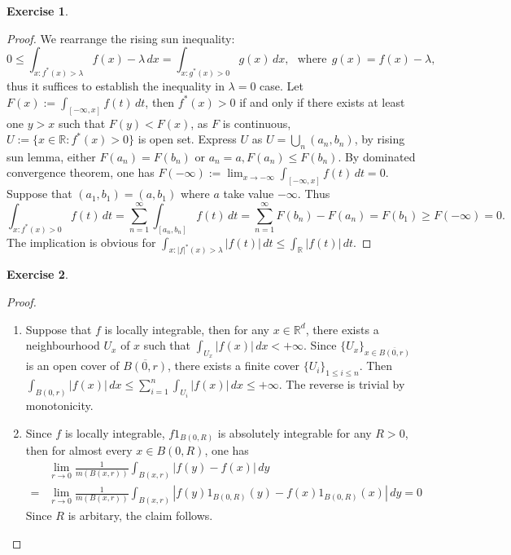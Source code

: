 \documentclass[a4paper]{article}
\newtheorem{ex}{Exercise}[subsection]
\begin{document}
\begin{ex}\end{ex}\begin{proof}
We rearrange the rising sun inequality:$$
0 \leq \int_{x: f^*(x) > \lambda} f(x) - \lambda\,dx = \int_{x: g^*(x) > 0} g(x)\,dx,\ \ \ \text{where}\ \ g(x) = f(x) - \lambda,
$$thus it suffices to establish the inequality in $\lambda = 0$ case. Let $F(x) := \int_{[-\infty, x]}f(t)\,dt$, then 
$f^*(x) > 0$ if and only if there exists at least one $y > x$ such that $F(y) < F(x)$, as $F$ is continuous, 
$U := \{x \in \mathbb{R} : f^*(x) > 0\}$ is open set. Express $U$ as $U = \bigcup_{n} (a_n, b_n)$, by rising sun lemma,
either $F(a_n) = F(b_n)$ or $a_n = a, F(a_n) \leq F(b_n)$. By dominated convergence theorem, one has 
$F(-\infty) := \lim_{x \to -\infty} \int_{[-\infty, x]} f(t)\,dt = 0$. Suppose that $(a_1, b_1) = (a, b_1)$ where
$a$ take value $-\infty$. Thus \[
\int_{x: f^*(x) > 0} f(t)\,dt = \sum_{n = 1}^\infty \int_{[a_n, b_n]}f(t)\,dt = \sum_{n = 1}^\infty F(b_n) - F(a_n)
= F(b_1) \geq F(-\infty) = 0. 
\]The implication is obvious for $\int_{x: |f|^*(x) > \lambda} |f(t)|\,dt \leq \int_\mathbb{R} |f(t)|\,dt$.
\end{proof}

\begin{ex}\end{ex}\begin{proof}\ 
\begin{enumerate}[label = (\roman*)]
    \item Suppose that $f$ is locally integrable, then for any $x \in \mathbb{R}^d$, there exists a neighbourhood $U_x$ of 
    $x$ such that $\int_{U_x} |f(x)|\,dx < +\infty$. Since $\{U_x\}_{x \in \overline{B(0, r)}}$ is an open cover of 
    $\overline{B(0, r)}$, there exists a finite cover $\{U_i\}_{1 \leq i \leq n}$. Then 
    $\int_{B(0, r)} |f(x)| \,dx \leq \sum_{i = 1}^n \int_{U_i}|f(x)|\,dx \leq +\infty$. The reverse is trivial by 
    monotonicity.
    \item Since $f$ is locally integrable, $f1_{B(0, R)}$ is absolutely integrable for any $R > 0$, then for almost
    every $x \in B(0, R)$, one has\begin{align*}
    &\lim_{r \to 0} \frac{1}{m(B(x, r))}\int_{B(x, r)}|f(y) - f(x)|\,dy\\ = 
    {}&\lim_{r \to 0} \frac{1}{m(B(x, r))}\int_{B(x, r)}|f(y)1_{B(0, R)}(y) - f(x)1_{B(0, R)}(x)|\,dy = 0
    \end{align*}
    Since $R$ is arbitary, the claim follows.\qedhere
\end{enumerate}
\end{proof}
\end{document}
